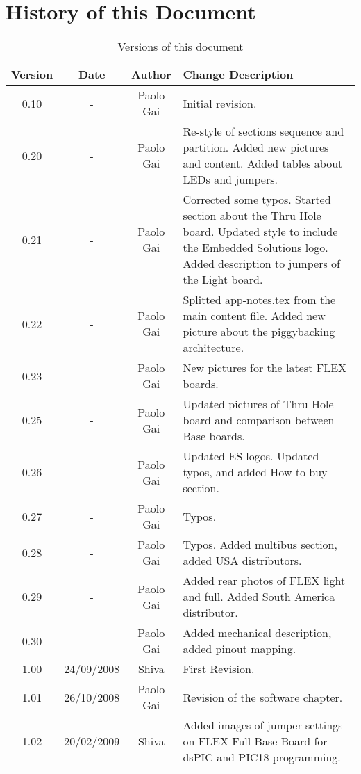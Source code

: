 \section{History of this Document}
\label{sec:hist_doc}
\begin{small}
\begin{table}[ht]
\centering
  \begin{tabular}{|c|c|c|p{}|}
    \hline
    {\bf Version} & {\bf Date} & {\bf Author} & {\bf Change Description}\\
    \hline \hline
    0.10 & - & Paolo Gai & Initial revision.\\
    \hline
    0.20 & - & Paolo Gai & Re-style of sections sequence and partition. Added new pictures and content. Added tables about LEDs and jumpers.\\
    \hline
    0.21 & - & Paolo Gai & Corrected some typos. Started section about the Thru Hole board. Updated style to include the Embedded Solutions logo. Added description to jumpers of the Light board.\\
    \hline
    0.22 & - & Paolo Gai & Splitted app-notes.tex from the main content file. Added new picture about the piggybacking architecture.\\
    \hline
    0.23 & - & Paolo Gai & New pictures for the latest FLEX boards.\\
    \hline
    0.25 & - & Paolo Gai & Updated pictures of Thru Hole board and comparison between Base boards.\\
    \hline
    0.26 & - & Paolo Gai & Updated ES logos. Updated typos, and added How to buy section.\\
    \hline
    0.27 & - & Paolo Gai & Typos.\\
    \hline
    0.28 & - & Paolo Gai & Typos. Added multibus section, added USA distributors.\\
    \hline
    0.29 & - & Paolo Gai & Added rear photos of FLEX light and full. Added South America distributor.\\
    \hline
    0.30 & - & Paolo Gai & Added mechanical description, added pinout mapping.\\
    \hline
    1.00 & 24/09/2008 & Shiva & First Revision.\\
    \hline
    1.01 & 26/10/2008 & Paolo Gai & Revision of the software chapter.\\
    \hline
		1.02 & 20/02/2009 & Shiva & Added images of jumper settings on FLEX Full Base Board for dsPIC and PIC18 programming.\\
    \hline
  \end{tabular}
\caption{Versions of this document}
\label{tbl:versions}
\end{table}
\end{small}
